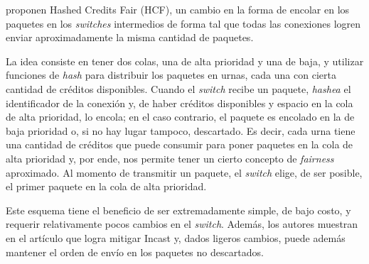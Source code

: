 \documentclass[runningheads,a4paper]{llncs}
\begin{document}
\citet{Shpiner_HCF_2010} proponen Hashed Credits Fair (HCF), un cambio en la forma de encolar en los paquetes en los \textit{switches} intermedios de forma tal que todas las conexiones logren enviar aproximadamente la misma cantidad de paquetes.

La idea consiste en tener dos colas, una de alta prioridad y una de baja, y utilizar funciones de \textit{hash} para distribuir los paquetes en urnas, cada una con cierta cantidad de créditos disponibles. Cuando el \textit{switch} recibe un paquete, \textit{hashea} el identificador de la conexión y, de haber créditos disponibles y espacio en la cola de alta prioridad, lo encola; en el caso contrario, el paquete es encolado en la de baja prioridad o, si no hay lugar tampoco, descartado. Es decir, cada urna tiene una cantidad de créditos que puede consumir para poner paquetes en la cola de alta prioridad y, por ende, nos permite tener un cierto concepto de \textit{fairness} aproximado. Al momento de transmitir un paquete, el \textit{switch} elige, de ser posible, el primer paquete en la cola de alta prioridad.

Este esquema tiene el beneficio de ser extremadamente simple, de bajo costo, y requerir relativamente pocos cambios en el \textit{switch}. Además, los autores muestran en el artículo que logra mitigar Incast y, dados ligeros cambios, puede además mantener el orden de envío en los paquetes no descartados.






\end{document}

